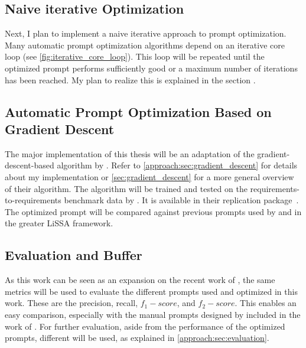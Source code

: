 \subsection{Naive iterative Optimization}
\label{phase_naive_iterative}

Next, I plan to implement a naive iterative approach to prompt optimization.
Many automatic prompt optimization algorithms \citeiterative depend on an iterative core loop (see \autoref{fig:iterative_core_loop}). This loop will be repeated until the optimized prompt performs sufficiently good or a maximum number of iterations has been reached.
My plan to realize this is explained in the section .


\subsection{Automatic Prompt Optimization Based on Gradient Descent}
\label{phase_gradient_descent}

The major implementation of this thesis will be an adaptation of the gradient-descent-based \APO algorithm by .
Refer to \autoref{approach:sec:gradient_descent} for details about my implementation or \autoref{sec:gradient_descent} for a more general overview of their algorithm.
The \APO algorithm will be trained and tested on the requirements-to-requirements benchmark data by \citeauthor{hey2025RequirementsTraceability}.
It is available in their replication package~\cite{hey2025ReplicationPackage}.
The optimized prompt will be compared against previous prompts used by \citeauthor{fuchss2025LiSSAGeneric} and \citeauthor{hey2025RequirementsTraceability} in the greater LiSSA framework.


\subsection{Evaluation and Buffer}
\label{phase_evaluation}
As this work can be seen as an expansion on the recent work of , the same metrics will be used to evaluate the different prompts used and optimized in this work.
These are the precision, recall, $f_1-score$, and $f_2-score$.
This enables an easy comparison, especially with the manual prompts designed by  included in the work of \citeauthor{hey2025RequirementsTraceability}.
For further evaluation, aside from the performance of the optimized prompts, different \LLMs will be used, as explained in \autoref{approach:sec:evaluation}.




